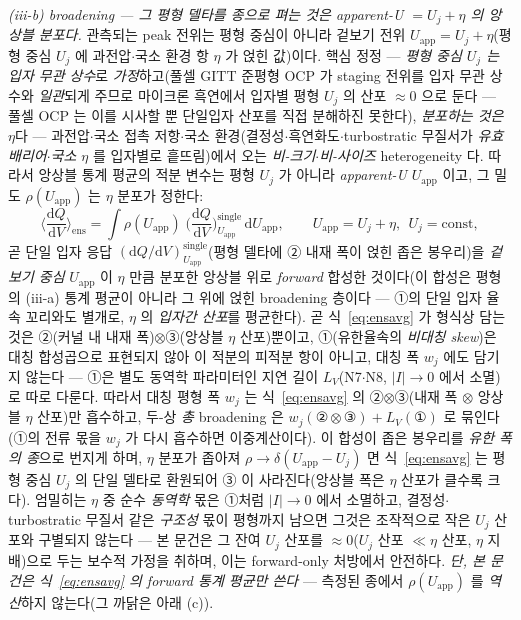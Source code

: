 \documentclass[11pt,a4paper]{article}
\newcommand{\dd}{\mathrm{d}}
\newcommand{\app}{\mathrm{app}}
\begin{document}
\emph{(iii-b) broadening — 그 평형 델타를 종으로 펴는 것은 \emph{apparent-U $=U_j+\eta$} 의 앙상블 분포다.} 관측되는 peak
전위는 평형 중심이 아니라 겉보기 전위 $U_\app=U_j+\eta$(평형 중심 $U_j$ 에 과전압$\cdot$국소 환경 항 $\eta$ 가 얹힌
값)이다. 핵심 정정 — \emph{평형 중심 $U_j$ 는 입자 무관 상수}로 \emph{가정}하고(풀셀 GITT 준평형 OCP 가 staging 전위를
입자 무관 상수와 \emph{일관}되게 주므로\cite{park2021} 마이크론 흑연에서 입자별 평형 $U_j$ 의 산포 $\approx0$ 으로 둔다 —
풀셀 OCP 는 이를 시사할 뿐 단일입자 산포를 직접 분해하진 못한다), \emph{분포하는 것은 $\eta$}다 —
과전압$\cdot$국소 접촉 저항$\cdot$국소 환경(결정성$\cdot$흑연화도$\cdot$turbostratic 무질서가 \emph{유효 배리어$\cdot$국소
$\eta$} 를 입자별로 흩뜨림)에서 오는 \emph{비-크기$\cdot$비-사이즈} heterogeneity 다. 따라서 앙상블 통계 평균의 적분
변수는 평형 $U_j$ 가 아니라 \emph{apparent-U} $U_\app$ 이고, 그 밀도 $\rho(U_\app)$ 는 $\eta$ 분포가 정한다:
\begin{equation}
\Big\langle\frac{\dd Q}{\dd V}\Big\rangle_\mathrm{ens}
=\int \rho(U_\app)\;\Big(\frac{\dd Q}{\dd V}\Big)^\mathrm{single}_{U_\app}\,\dd U_\app,
\qquad U_\app=U_j+\eta,\ \ U_j=\text{const},
\label{eq:ensavg}
\end{equation}
곧 단일 입자 응답 $(\dd Q/\dd V)^\mathrm{single}_{U_\app}$(평형 델타에 ② 내재 폭이 얹힌 좁은 봉우리)을 \emph{겉보기 중심}
$U_\app$ 이 $\eta$ 만큼 분포한 앙상블 위로 \emph{forward} 합성한 것이다(이 합성은 평형의 (iii-a) 통계 평균이 아니라 그
위에 얹힌 broadening 층이다 — ①의 단일 입자 율속 꼬리와도 별개로, $\eta$ 의 \emph{입자간 산포}를 평균한다). 곧
식~\eqref{eq:ensavg} 가 형식상 담는 것은 ②(커널 내 내재 폭)$\otimes$③(앙상블 $\eta$ 산포)뿐이고, ①(유한율속의
\emph{비대칭 skew})은 대칭 합성곱으로 표현되지 않아 이 적분의 피적분 항이 아니고, 대칭 폭 $w_j$ 에도 담기지 않는다 — ①은
별도 동역학 파라미터인 지연 길이 $L_V$(N7$\cdot$N8, $|I|\!\to\!0$ 에서 소멸)로 따로 다룬다. 따라서 대칭 평형 폭 $w_j$ 는
식~\eqref{eq:ensavg} 의 ②$\otimes$③(내재 폭 $\otimes$ 앙상블 $\eta$ 산포)만 흡수하고, 두-상 \emph{총} broadening 은
$w_j(\text{②}\otimes\text{③})+L_V(\text{①})$ 로 묶인다(①의 전류 몫을 $w_j$ 가 다시 흡수하면 이중계산이다). 이 합성이
좁은 봉우리를 \emph{유한 폭의 종}으로 번지게 하며, $\eta$ 분포가 좁아져 $\rho\!\to\!\delta(U_\app-U_j)$ 면
식~\eqref{eq:ensavg} 는 평형 중심 $U_j$ 의 단일 델타로 환원되어 ③ 이 사라진다(앙상블 폭은 $\eta$ 산포가 클수록 크다).
엄밀히는 $\eta$ 중 순수 \emph{동역학} 몫은 ①처럼 $|I|\!\to\!0$ 에서 소멸하고, 결정성$\cdot$turbostratic 무질서 같은
\emph{구조성} 몫이 평형까지 남으면 그것은 조작적으로 작은 $U_j$ 산포와 구별되지 않는다 — 본 문건은 그 잔여 $U_j$ 산포를
$\approx0$($U_j$ 산포 $\ll\eta$ 산포, $\eta$ 지배)으로 두는 보수적 가정을 취하며, 이는 forward-only 처방에서 안전하다. \emph{단, 본 문건은 식~\eqref{eq:ensavg} 의 forward 통계 평균만
쓴다} — 측정된 종에서 $\rho(U_\app)$ 를 \emph{역산}하지 않는다(그 까닭은 아래 (c)).
\end{document}
